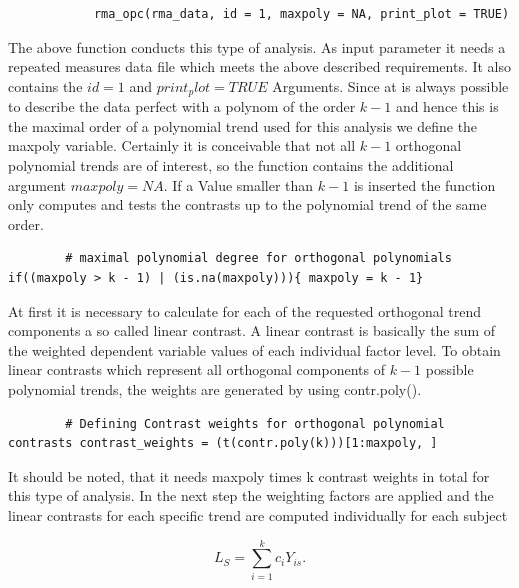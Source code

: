 \documentclass[11pt]{article}
\begin{document}
		\begin{lstlisting}
			rma_opc(rma_data, id = 1, maxpoly = NA, print_plot = TRUE)
		\end{lstlisting}
		
		The above function conducts this type of analysis. As input parameter it needs a repeated measures data file which meets the above described requirements. It also contains the $id = 1$ and $print_plot = TRUE$ Arguments. Since at is always possible to describe the data perfect with a polynom of the order $k - 1$ and hence this is the maximal order of a polynomial trend used for this analysis we define the maxpoly variable. Certainly it is conceivable that not all $k - 1$ orthogonal polynomial trends are of interest, so the function contains the additional argument $maxpoly = NA$. If a Value smaller than $k - 1$ is inserted the function only computes and tests the contrasts up to the polynomial trend of the same order.\\
		
		
		\begin{lstlisting}
		# maximal polynomial degree for orthogonal polynomials if((maxpoly > k - 1) | (is.na(maxpoly))){ maxpoly = k - 1}
		\end{lstlisting}
		
		At first it is necessary to calculate for each of the requested orthogonal trend components a so called linear contrast. A linear contrast is basically the sum of the weighted dependent variable values of each individual factor level. To obtain linear contrasts which represent all orthogonal components of $k - 1$ possible polynomial trends, the weights are generated by using contr.poly().\\
		
		\begin{lstlisting}
		# Defining Contrast weights for orthogonal polynomial contrasts contrast_weights = (t(contr.poly(k)))[1:maxpoly, ]
		\end{lstlisting}
		
		It should be noted, that it needs maxpoly times k contrast weights in total for this type of analysis. In the next step the weighting factors are applied and the linear contrasts for each specific trend are computed individually for each subject
		
		\begin{equation}
		L_S = \sum_{i=1}^{k}c_iY_{is}.
		\end{equation}
		
		\vspace{8 mm}
		
\end{document}
